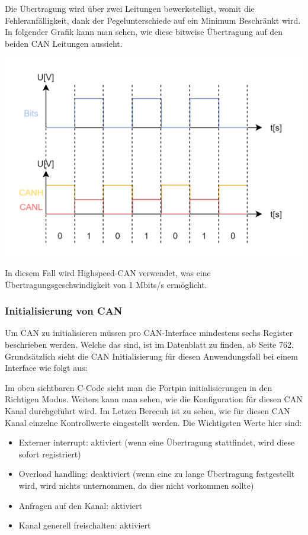 \documentclass[paper=a4, 12pt]{scrreprt}
\begin{document}
			Die Übertragung wird über zwei Leitungen bewerkstelligt, womit die Fehleranfälligkeit, dank der Pegelunterschiede auf ein Minimum Beschränkt wird. In folgender Grafik kann man sehen, wie diese bitweise Übertragung auf den beiden CAN Leitungen aussieht.
			\begin{adjustbox}{center,caption={CAN Übertragung},label={fig:CANbits.png},nofloat=figure,vspace=\bigskipamount}
				\includegraphics[width=\textwidth]{img/CAN_bits.png}
			\end{adjustbox}
		
			In diesem Fall wird Highspeed-CAN verwendet, was eine Übertragungsgeschwindigkeit von 1 Mbits/s ermöglicht.
			\newpage
			
			\subsubsection{Initialisierung von CAN}
			Um CAN zu initialisieren müssen pro CAN-Interface mindestens sechs Register beschrieben werden.
			Welche das sind, ist im Datenblatt zu finden, ab Seite 762. 
			Grundsätzlich sieht die CAN Initialisierung für diesen Anwendungsfall bei einem Interface wie folgt aus:
			
			Im oben sichtbaren C-Code sieht man die Portpin initialisierungen in den Richtigen Modus. Weiters kann man sehen, wie die Konfiguration für diesen CAN Kanal durchgeführt wird. Im Letzen Berecuh ist zu sehen, wie für diesen CAN Kanal einzelne Kontrollwerte eingestellt werden.
			Die Wichtigsten Werte hier sind:
			\begin{itemize}
				\item Externer interrupt: aktiviert (wenn eine Übertragung stattfindet, wird diese sofort registriert)
				\item Overload handling: deaktiviert (wenn eine zu lange Übertragung festgestellt wird, wird nichts unternommen, da dies nicht vorkommen sollte)
				\item Anfragen auf den Kanal: aktiviert
				\item Kanal generell freischalten: aktiviert
			\end{itemize}
			\newpage 
			
\end{document}
